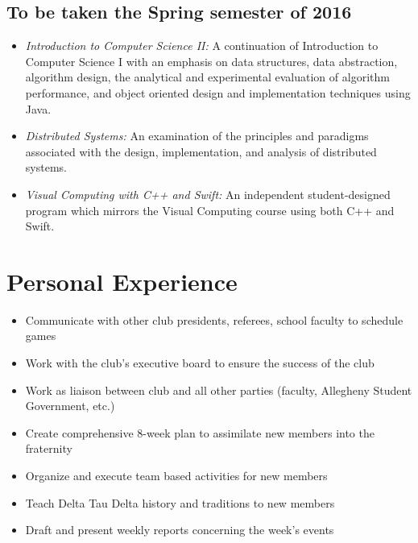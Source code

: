 \documentclass[11pt,a4paper,sans]{moderncv} %
\begin{document}
{{\subsection{To be taken the Spring semester of 2016}
\begin{itemize}
\item{\textit{Introduction to Computer Science II: }{A continuation of Introduction to Computer Science I with an emphasis on data structures, data abstraction, algorithm design, the analytical and experimental evaluation of algorithm performance, and object oriented design and implementation techniques using Java.}}
\item{\textit{Distributed Systems: }{An examination of the principles and paradigms associated with the design, implementation, and analysis of distributed systems.}}
\item{\textit{Visual Computing with C++ and Swift: }{ An independent student-designed program which mirrors the Visual Computing course using both C++ and Swift.}}
\end{itemize}

\section{Personal Experience}
\begin{itemize}
\item{Communicate with other club presidents, referees, school faculty to schedule games}
\item{Work with the club's executive board to ensure the success of the club}
\item{Work as liaison between club and all other parties (faculty, Allegheny Student Government, etc.) }
\end{itemize}

\begin{itemize}
\item{Create comprehensive 8-week plan to assimilate new members into the fraternity}
\item{Organize and execute team based activities for new members}
\item{Teach Delta Tau Delta history and traditions to new members}
\item{Draft and present weekly reports concerning the week's events}
\end{itemize}

}}
\end{document}
